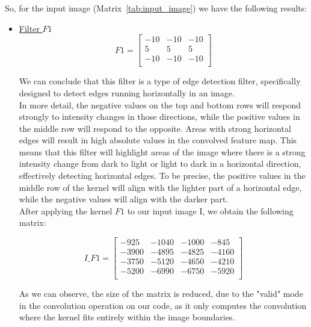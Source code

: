 So, for the input image (Matrix~\ref{tab:input_image}) we have the following results:
\begin{itemize}
	\item \underline{Filter $F1$}\\
	
	\begin{equation}
		F1 = \begin{bmatrix}
			-10 & -10 & -10   \\
			  5 &  5 &  5   \\
			-10 & -10 & -10   \\
		\end{bmatrix}
	\end{equation}
	\vspace{2mm}
	
	We can conclude that this filter is a type of edge detection filter, specifically designed to detect edges running horizontally in an image. \\
	In more detail, the negative values on the top and bottom rows will respond strongly to intensity changes in those directions, while the positive values in the middle row will respond to the opposite. Areas with strong horizontal edges will result in high absolute values in the convolved feature map. This means that this filter will highlight areas of the image where there is a strong intensity change from dark to light or light to dark in a horizontal direction, effectively detecting horizontal edges. To be precise, the positive values in the middle row of the kernel will align with the lighter part of a horizontal edge, while the negative values will align with the darker part.\\
	
	After applying the kernel $F1$ to our input image I, we obtain the following matrix:

	\begin{equation}
		I\_F1 = \begin{bmatrix}
			-925 & -1040 & -1000 & -845 \\
			 -3900 & -4895 & -4825 & -4160  \\
			-3750 & -5120 &-4650 & -4210   \\
			-5200 & -6990 & -6750 & -5920 \\
			\end{bmatrix}
	\end{equation}
	\vspace{2mm}
	
	As we can observe, the size of the matrix is reduced, due to the "valid" mode in the convolution operation on our code, as it only computes the convolution where the kernel fits entirely within the image boundaries.\\
	

\end{itemize}
